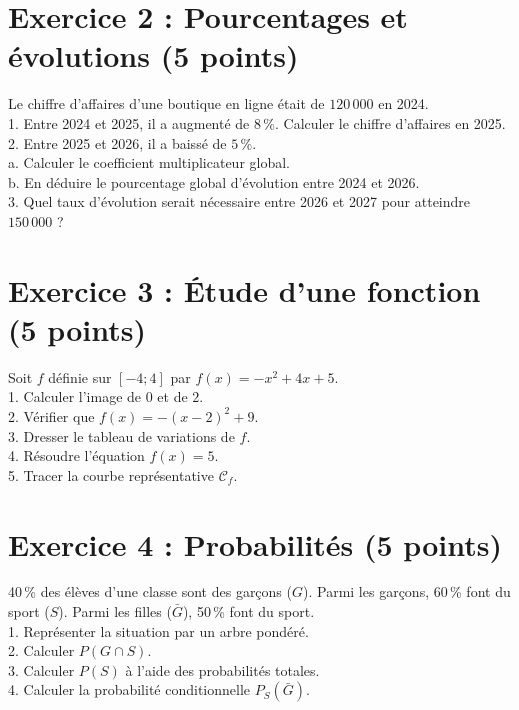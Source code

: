 \documentclass[12pt,a4paper]{article}
\begin{document}
\section*{Exercice 2 : Pourcentages et évolutions (5 points)}
Le chiffre d'affaires d'une boutique en ligne était de $120\,000$ \texteuro{} en 2024.\\
1. Entre 2024 et 2025, il a augmenté de $8\,\%$. Calculer le chiffre d'affaires en 2025.\\
2. Entre 2025 et 2026, il a baissé de $5\,\%$.\\
a. Calculer le coefficient multiplicateur global.\\
b. En déduire le pourcentage global d'évolution entre 2024 et 2026.\\
3. Quel taux d'évolution serait nécessaire entre 2026 et 2027 pour atteindre $150\,000$ \texteuro{} ?

\section*{Exercice 3 : Étude d'une fonction (5 points)}
Soit $f$ définie sur $[-4 ; 4]$ par $f(x) = -x^2 + 4x + 5$.\\
1. Calculer l'image de $0$ et de $2$.\\
2. Vérifier que $f(x) = -(x - 2)^2 + 9$.\\
3. Dresser le tableau de variations de $f$.\\
4. Résoudre l'équation $f(x) = 5$.\\
5. Tracer la courbe représentative $\mathcal{C}_f$.

\section*{Exercice 4 : Probabilités (5 points)}
40\,\% des élèves d'une classe sont des garçons ($G$). Parmi les garçons, 60\,\% font du sport ($S$). Parmi les filles ($\bar{G}$), 50\,\% font du sport.\\
1. Représenter la situation par un arbre pondéré.\\
2. Calculer $P(G \cap S)$.\\
3. Calculer $P(S)$ à l'aide des probabilités totales.\\
4. Calculer la probabilité conditionnelle $P_S(\bar{G})$.
\end{document}

